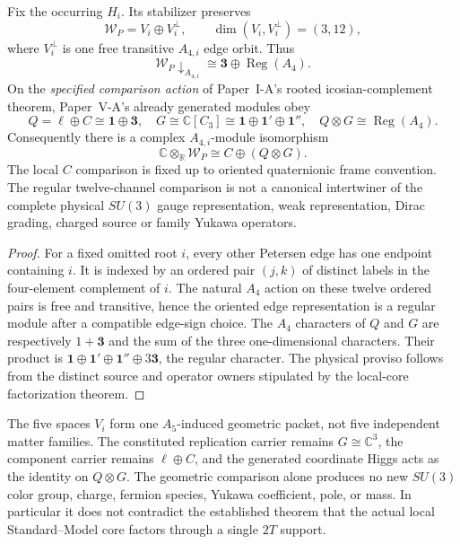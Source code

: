 \documentclass[12pt,a4paper]{article}
\begin{document}
\begin{theorem}
\label{p5:thm:v321-rooted-3plus12-matter}
Fix the occurring $H_i$. Its stabilizer preserves
\[
 \mathscr W_P=V_i\oplus V_i^\perp,
 \qquad \dim(V_i,V_i^\perp)=(3,12),
\]
where $V_i^\perp$ is one free transitive $A_{4,i}$ edge orbit. Thus
\[
 \boxed{\mathscr W_P\!\downarrow_{A_{4,i}}
  \cong\mathbf3\oplus\operatorname{Reg}(A_4).}
\]
On the \emph{specified comparison action} of Paper~I-A's rooted
icosian-complement theorem, Paper~V-A's already generated modules obey
\[
 Q=\ell\oplus C\cong\mathbf1\oplus\mathbf3,
 \quad G\cong\mathbb C[C_3]
     \cong\mathbf1\oplus\mathbf1'\oplus\mathbf1'',
 \quad Q\otimes G\cong\operatorname{Reg}(A_4).
\]
Consequently there is a complex $A_{4,i}$-module isomorphism
\[
 \boxed{\mathbb C\otimes_{\mathbb R}\mathscr W_P
     \cong C\oplus(Q\otimes G).}
\]
The local $C$ comparison is fixed up to oriented quaternionic frame
convention. The regular twelve-channel comparison is not a canonical
intertwiner of the complete physical $SU(3)$ gauge representation, weak
representation, Dirac grading, charged source or family Yukawa operators.
\end{theorem}
\begin{proof}
For a fixed omitted root $i$, every other Petersen edge has one endpoint
containing $i$. It is indexed by an ordered pair $(j,k)$ of distinct labels
in the four-element complement of $i$. The natural $A_4$ action on these
twelve ordered pairs is free and transitive, hence the oriented edge
representation is a regular module after a compatible edge-sign choice.
The $A_4$ characters of $Q$ and $G$ are respectively $1+\mathbf3$ and
the sum of the three one-dimensional characters. Their product is
$\mathbf1\oplus\mathbf1'\oplus\mathbf1''\oplus3\mathbf3$, the regular
character. The physical proviso follows from the distinct source and
operator owners stipulated by the local-core factorization theorem.
\end{proof}

\begin{corollary}
\label{p5:cor:v321-petersen-nospurious-matter}
The five spaces $V_i$ form one $A_5$-induced geometric packet, not five
independent matter families. The constituted replication carrier remains
$G\cong\mathbb C^3$, the component carrier remains $\ell\oplus C$, and
the generated coordinate Higgs acts as the identity on $Q\otimes G$.
The geometric comparison alone produces no new $SU(3)$ color group, charge,
fermion species, Yukawa coefficient, pole, or mass. In particular it does
not contradict the established theorem that the actual local Standard--Model
core factors through a single $2T$ support.
\end{corollary}
\end{document}

